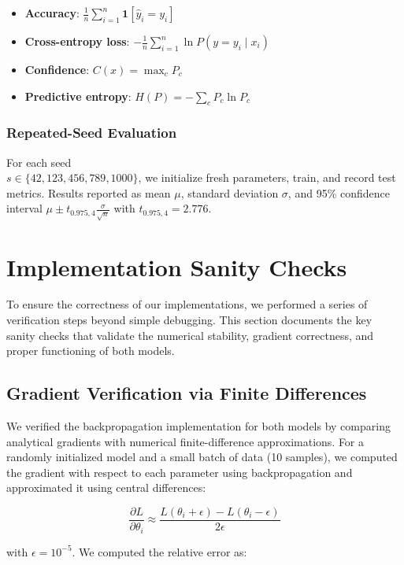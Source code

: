 \documentclass[sigconf,screen,nonacm,nofonts]{acmart}
\begin{document}
\begin{itemize}
    \item \textbf{Accuracy}: \(\frac{1}{n}\sum_{i=1}^n \mathbf{1}[\hat{y}_i = y_i]\)
    \item \textbf{Cross-entropy loss}: \(-\frac{1}{n}\sum_{i=1}^n \ln P(y = y_i \mid x_i)\)
    \item \textbf{Confidence}: \(C(x) = \max_c P_c\)
    \item \textbf{Predictive entropy}: \(H(P) = -\sum_c P_c \ln P_c\)
\end{itemize}

\subsubsection{Repeated-Seed Evaluation}
For each seed \\ \(s \in \{42, 123, 456, 789, 1000\}\), we initialize fresh parameters, train, and record test metrics. Results reported as mean \(\mu\), standard deviation \(\sigma\), and 95\% confidence interval \(\mu \pm t_{0.975,4} \frac{\sigma}{\sqrt{n}}\) with \(t_{0.975,4} = 2.776\).

\section{Implementation Sanity Checks}

To ensure the correctness of our implementations, we performed a series of verification steps beyond simple debugging. This section documents the key sanity checks that validate the numerical stability, gradient correctness, and proper functioning of both models.

\subsection{Gradient Verification via Finite Differences}

We verified the backpropagation implementation for both models by comparing analytical gradients with numerical finite-difference approximations. For a randomly initialized model and a small batch of data (10 samples), we computed the gradient with respect to each parameter using backpropagation and approximated it using central differences:

\[
\frac{\partial L}{\partial \theta_i} \approx \frac{L(\theta_i + \epsilon) - L(\theta_i - \epsilon)}{2\epsilon}
\]

with \(\epsilon = 10^{-5}\). We computed the relative error as:
\end{document}
